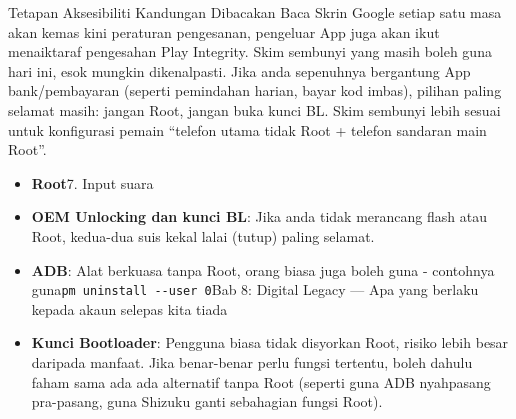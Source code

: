 \begin{tcbwarn}{Tetapan Aksesibiliti Kandungan Dibacakan Baca Skrin}
Google setiap satu masa akan kemas kini peraturan pengesanan, pengeluar App juga akan ikut menaiktaraf pengesahan Play Integrity. Skim sembunyi yang masih boleh guna hari ini, esok mungkin dikenalpasti. Jika anda sepenuhnya bergantung App bank/pembayaran (seperti pemindahan harian, bayar kod imbas), pilihan paling selamat masih: jangan Root, jangan buka kunci BL. Skim sembunyi lebih sesuai untuk konfigurasi pemain “telefon utama tidak Root + telefon sandaran main Root”.

\end{tcbwarn}


\begin{itemize}
  \item \textbf{Root}7. Input suara
  \item \textbf{OEM Unlocking dan kunci BL}: Jika anda tidak merancang flash atau Root, kedua-dua suis kekal lalai (tutup) paling selamat.
  \item \textbf{ADB}: Alat berkuasa tanpa Root, orang biasa juga boleh guna - contohnya guna\texttt{pm uninstall -\allowbreak -\allowbreak user 0}Bab 8: Digital Legacy — Apa yang berlaku kepada akaun selepas kita tiada
  \item \textbf{Kunci Bootloader}: Pengguna biasa tidak disyorkan Root, risiko lebih besar daripada manfaat. Jika benar-benar perlu fungsi tertentu, boleh dahulu faham sama ada ada alternatif tanpa Root (seperti guna ADB nyahpasang pra-pasang, guna Shizuku ganti sebahagian fungsi Root).
\end{itemize}

